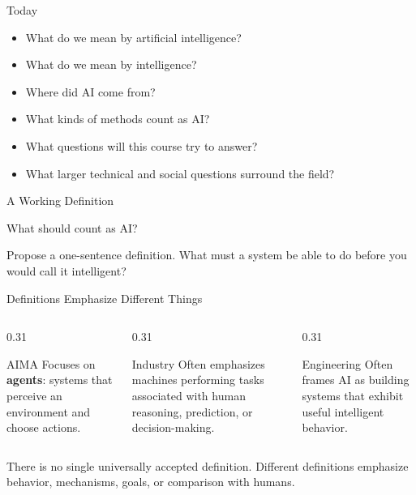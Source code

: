 \documentclass[aspectratio=169]{beamer}
\begin{document}
\begin{frame}{Today}
  \begin{itemize}
    \item What do we mean by artificial intelligence?
    \item What do we mean by intelligence?
    \item Where did AI come from?
    \item What kinds of methods count as AI?
    \item What questions will this course try to answer?
    \item What larger technical and social questions surround the field?
  \end{itemize}
\end{frame}


\begin{frame}{A Working Definition}
  \begin{center}
    {\Huge What should count as AI?}
  \end{center}
  \vspace{0.18in}
  \begin{activity}
    Propose a one-sentence definition. What must a system be able to do before you would call it intelligent?
  \end{activity}
\end{frame}

\begin{frame}[shrink=4]{Definitions Emphasize Different Things}
  \begin{columns}[T,onlytextwidth]
    \begin{column}{0.31\textwidth}
      \begin{block}{AIMA}
        Focuses on \textbf{agents}: systems that perceive an environment and choose actions.
      \end{block}
    \end{column}
    \begin{column}{0.31\textwidth}
      \begin{block}{Industry}
        Often emphasizes machines performing tasks associated with human reasoning, prediction, or decision-making.
      \end{block}
    \end{column}
    \begin{column}{0.31\textwidth}
      \begin{block}{Engineering}
        Often frames AI as building systems that exhibit useful intelligent behavior.
      \end{block}
    \end{column}
  \end{columns}
  \vspace{0.15in}
  \begin{keyidea}
    There is no single universally accepted definition. Different definitions emphasize behavior, mechanisms, goals, or comparison with humans.
  \end{keyidea}
\end{frame}
\end{document}
